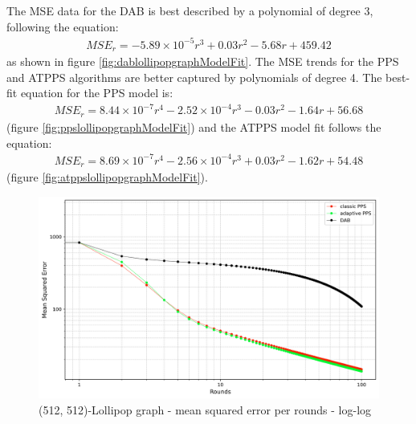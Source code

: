 The MSE data for the DAB is best described by a polynomial of degree 3, following the equation:
\begin{align}
    MSE_r=-5.89\times10^{-5}r^{3}+0.03r^{2}-5.68r+459.42    
\end{align}
as shown in figure \ref{fig:dablollipopgraphModelFit}. The MSE trends for the PPS and ATPPS algorithms are better captured by polynomials of degree 4. The best-fit equation for the PPS model is:
\begin{align}
    MSE_r=8.44\times 10^{-7}r^{4}-2.52\times 10^{-4}r^{3}-0.03r^{2}-1.64r+56.68    
\end{align}
(figure \ref{fig:ppslollipopgraphModelFit}) and the ATPPS model fit follows the equation:
\begin{align}
    MSE_r=8.69 \times 10^{-7}r^{4}-2.56 \times 10^{-4}r^{3}+0.03r^{2}-1.62r+54.48    
\end{align}
(figure \ref{fig:atppslollipopgraphModelFit}).

\begin{figure}[]
    \centering
    \includegraphics[width=\linewidth]{figures/Simulation_outcomes/LollipopGraph/512_512/DAB_vs_PPS_LG_r100_n1024_averaged_loglog.png}
    \caption{(512, 512)-Lollipop graph - mean squared error per rounds - log-log}
    \label{fig:lollipopgraphMSEperRoundLogLog}
\end{figure}


